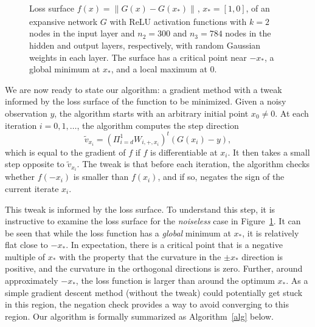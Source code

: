 \documentclass[11pt]{article}
\newcommand{\xo}{x_\ast}
\newcommand{\Tnorm}{}
\newcommand\norm[2][\Tnorm]{\ensuremath{{\left\|#2\right\|}_{#1}}}
\newcommand\stepdir[1]{\tilde v_{#1}}
\newcommand{\PiWdi}{\Pi_{i=d}^1 W_{i,+,x_i}}
\begin{document}
\begin{figure}
\centering
{}
\caption{\label{fig:losssurface} Loss surface $f(x) = \norm{G(x) - G(\xo)}$, $\xo=[1,0]$, of an expansive network $G$ with ReLU activation functions with $k=2$ nodes  in the input layer and $n_2=300$ and  $n_3=784$ nodes in the hidden and output layers, respectively, with random Gaussian weights in each layer.
The surface has a critical point near $-\xo$, a global minimum at $\xo$, and a local maximum at $0$.
}
\end{figure}%

We are now ready to state our algorithm: a gradient method with a tweak informed by the loss surface of the function to be minimized.
Given a noisy observation $y$, the algorithm  starts with an arbitrary initial point $x_0 \neq 0$.
At each iteration $i=0,1,\ldots$, the algorithm  computes the step direction
\[
\stepdir{x_i} = (\PiWdi)^t (G(x_i) - y),
\]
which is equal to the gradient of $f$ if $f$ is differentiable at $x_i$.
It then takes a small step opposite to $\stepdir{x_i}$.
The tweak is that before each iteration, the algorithm checks whether $f(-x_i)$ is smaller than $f(x_i)$, and if so, negates the sign of the current iterate $x_i$.

This tweak is informed by the loss surface.
To understand this step, it is instructive to examine the loss surface for the \emph{noiseless} case in Figure~\ref{fig:losssurface}.
It can be seen that while the loss function has a \emph{global} minimum at $\xo$, it is relatively flat  close to $-\xo$.  In expectation, there is a critical point that is a negative multiple of $\xo$ with the property that the curvature in the $\pm \xo$ direction is positive, and the curvature in the orthogonal directions is zero. Further, around approximately $-\xo$, the loss function is larger than around the optimum $\xo$.
As a simple gradient descent method (without the tweak) could potentially get stuck in this region, the negation check provides a way to avoid converging to this region.
Our algorithm is formally summarized as Algorithm~\ref{alg} below.
\end{document}
